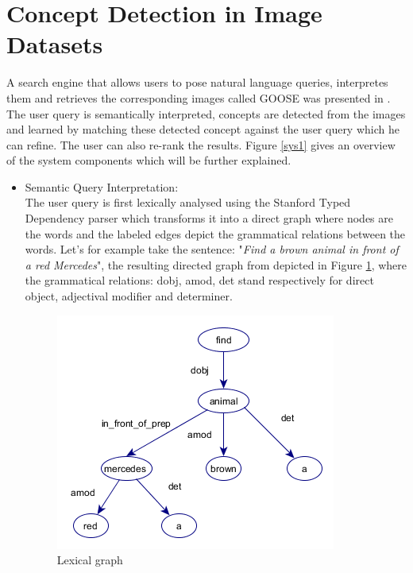 \section{Concept Detection in Image Datasets}
	A search engine that allows users to pose natural language queries, interpretes them and retrieves the corresponding images called GOOSE was presented in \cite{a:inter}. The user query is semantically interpreted, concepts are detected from the images and learned by matching these detected concept against the user query which he can refine. The user can also re-rank the results. Figure \ref{sys1} gives an overview of the system components which will be further explained.
\begin{itemize}
	\item Semantic Query Interpretation: \\
		The user query is first lexically analysed using the Stanford Typed Dependency parser \cite{a:parser} which transforms it into a direct graph where nodes are the words and the labeled edges depict the grammatical relations between the words. Let's for example take the sentence: "\textit{Find a brown animal in front of a red Mercedes}", the resulting  directed graph from depicted in Figure \ref{lexical}, where the grammatical relations: dobj, amod, det stand respectively for direct object, adjectival modifier and determiner.

\begin{figure}[!hb]
	  \centering
	  \includegraphics[scale=0.6]{graphics/standfordG.png} 
	  \caption{Lexical graph}
	  \label{lexical}
\end{figure}


\end{itemize}

